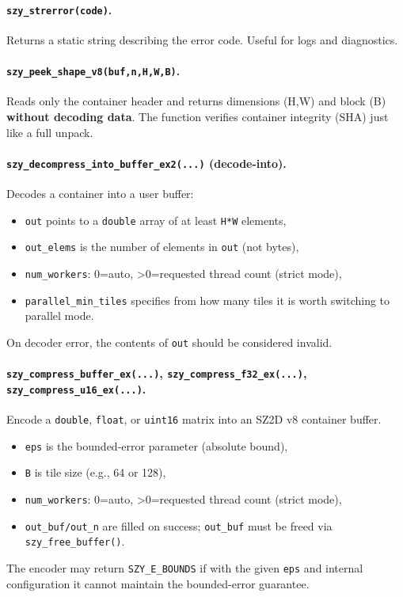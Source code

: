 \documentclass[11pt,a4paper]{article}
\begin{document}
\paragraph{\texttt{szy\_strerror(code)}.}
Returns a static string describing the error code. Useful for logs and diagnostics.

\paragraph{\texttt{szy\_peek\_shape\_v8(buf,n,H,W,B)}.}
Reads only the container header and returns dimensions (H,W) and block (B) \textbf{without decoding data}. The function verifies container integrity (SHA) just like a full unpack.

\paragraph{\texttt{szy\_decompress\_into\_buffer\_ex2(...)} (decode-into).}
Decodes a container into a user buffer:
\begin{itemize}
  \item \texttt{out} points to a \texttt{double} array of at least \texttt{H*W} elements,
  \item \texttt{out\_elems} is the number of elements in \texttt{out} (not bytes),
  \item \texttt{num\_workers}: 0=auto, >0=requested thread count (strict mode),
  \item \texttt{parallel\_min\_tiles} specifies from how many tiles it is worth switching to parallel mode.
\end{itemize}
On decoder error, the contents of \texttt{out} should be considered invalid.

\paragraph{\texttt{szy\_compress\_buffer\_ex(...)}, \texttt{szy\_compress\_f32\_ex(...)}, \texttt{szy\_compress\_u16\_ex(...)}.}
Encode a \texttt{double}, \texttt{float}, or \texttt{uint16} matrix into an SZ2D v8 container buffer.
\begin{itemize}
  \item \texttt{eps} is the bounded-error parameter (absolute bound),
  \item \texttt{B} is tile size (e.g., 64 or 128),
  \item \texttt{num\_workers}: 0=auto, >0=requested thread count (strict mode),
  \item \texttt{out\_buf/out\_n} are filled on success; \texttt{out\_buf} must be freed via \texttt{szy\_free\_buffer()}.
\end{itemize}
The encoder may return \texttt{SZY\_E\_BOUNDS} if with the given \texttt{eps} and internal configuration it cannot maintain the bounded-error guarantee.
\end{document}
